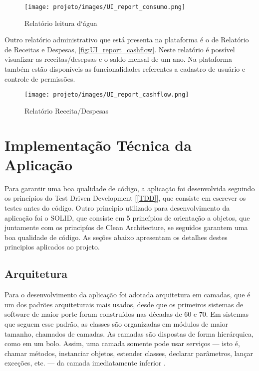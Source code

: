 \documentclass[12pt]{article}
\begin{document}
\begin{figure}[!ht]
  \centering
  \texttt{[image: projeto/images/UI\_report\_consumo.png]}
  \caption{Relatório leitura d`água}
  \label{fig:UI_report_consumo}
\end{figure}

Outro relatório administrativo que está presenta na plataforma é o de Relatório de Receitas e Despesas, \autoref{fig:UI_report_cashflow}. Neste relatório é possível visualizar as receitas/desepsas e o saldo mensal de um ano.
Na plataforma também estão disponíveis as funcionalidades referentes a cadastro de usuário e controle de permissões.

\begin{figure}[!ht]
  \centering
  \texttt{[image: projeto/images/UI\_report\_cashflow.png]}
  \caption{Relatório Receita/Despesas}
  \label{fig:UI_report_cashflow}
\end{figure}

\section{Implementação Técnica da Aplicação}
Para garantir uma boa qualidade de código, a aplicação foi desenvolvida seguindo os princípios do Test Driven Development [\ref{TDD}], que consiste em escrever os testes antes do código. Outro principio utilizado para desenvolvimento da aplicação foi o SOLID, que consiste em 5 princípios de orientação a objetos, que juntamente com os principíos de Clean Architecture, se seguidos garantem uma boa qualidade de código. As seções abaixo apresentam os detalhes destes principios aplicados ao projeto.

\subsection{Arquitetura}
Para o desenvolvimento da aplicação foi adotada arquitetura em camadas, que é um dos padrões arquiteturais mais usados, desde que os primeiros sistemas de software de maior porte foram construídos nas décadas de 60 e 70. Em sistemas que seguem esse padrão, as classes são organizadas em módulos de maior tamanho, chamados de camadas. As camadas são dispostas de forma hierárquica, como em um bolo. Assim, uma camada somente pode usar serviços — isto é, chamar métodos, instanciar objetos, estender classes, declarar parâmetros, lançar exceções, etc. — da camada imediatamente inferior \cite[Capítulo 7.2]{engsoftware}. 
\end{document}
